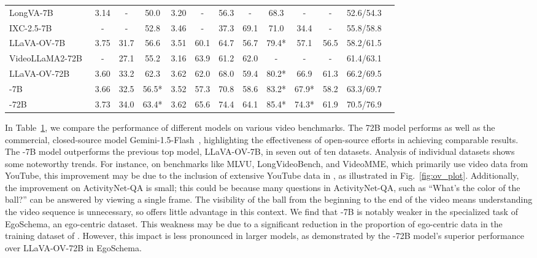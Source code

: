 \begin{table}[t!]
\begin{tabular}{@{}lcc|cc|cccccccc@{}}
    LongVA-7B~\citep{zhang2024long} & 3.14 & - & 50.0 & 3.20 & - & 56.3 & - & 68.3 & -  & -  & 52.6/54.3 \\
    IXC-2.5-7B~\citep{zhang2024internlm} & - & - & 52.8 & 3.46 & - & 37.3 & 69.1 & 71.0 & 34.4    & - & 55.8/58.8 \\   
    LLaVA-OV-7B~\citep{li2024llavaonevision} & 3.75 & 31.7 & 56.6 & 3.51 & 60.1 & 64.7 & 56.7 & 79.4* & 57.1    & 56.5 & 58.2/61.5 \\
    VideoLLaMA2-72B~\citep{cheng2024videollama2advancingspatialtemporal} & - & 27.1 & 55.2 & 3.16  & 63.9 & 61.2 & 62.0 & - & -  & - & 61.4/63.1 \\ 
    LLaVA-OV-72B~\citep{li2024llavaonevision} & 3.60 & 33.2 & 62.3 & 3.62  & 62.0 & 68.0 & 59.4 & 80.2* & 66.9  & 61.3 & 66.2/69.5 \\ \midrule 
    \rowcolor{front-color}
    \ModelName{}-7B & 3.66 & 32.5 & 56.5* & 3.52 & 57.3  & 70.8 & 58.6 & 83.2* & 67.9*   & 58.2 & 63.3/69.7 \\ 
    \rowcolor{front-color}
    \ModelName{}-72B & 3.73 & 34.0 & 63.4*  & 3.62 & 65.6 & 74.4 & 64.1 & 85.4* & 74.3*  & 61.9 & 70.5/76.9 \\ 
    \bottomrule
    \end{tabular}%
\label{tab:video-bench}
\end{table}

In Table~\ref{tab:video-bench}, we compare the performance of different models on various video benchmarks. The 72B model performs as well as the commercial, closed-source model Gemini-1.5-Flash~\citep{team2023gemini}, highlighting the effectiveness of open-source efforts in achieving comparable results. The \ModelName{}-7B model outperforms the previous top model, LLaVA-OV-7B, in seven out of ten datasets. Analysis of individual datasets shows some noteworthy trends. For instance, on benchmarks like MLVU, LongVideoBench, and VideoMME, which primarily use video data from YouTube, this improvement may be due to the inclusion of extensive YouTube data in \DataName{}, as illustrated in Fig.~\ref{fig:ov_plot}. Additionally, the improvement on ActivityNet-QA is small; this could be because many questions in ActivityNet-QA, such as ``What’s the color of the ball?'' can be answered by viewing a single frame. The visibility of the ball from the beginning to the end of the video means understanding the video sequence is unnecessary, so \DataName{} offers little advantage in this context.
We find that \ModelName{}-7B is notably weaker in the specialized task of EgoSchema, an ego-centric dataset. This weakness may be due to a significant reduction in the proportion of ego-centric data in the training dataset of \ModelName{}. However, this impact is less pronounced in larger models, as demonstrated by the \ModelName{}-72B model's superior performance over LLaVA-OV-72B in EgoSchema.

